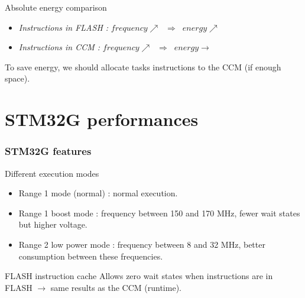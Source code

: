 \documentclass[
	11pt, %
]{beamer}
\begin{document}
\begin{frame}{Absolute energy comparison}
\begin{figure}
	\end{figure}
	\begin{itemize}
		\item \emph{Instructions in FLASH :} $frequency \nearrow \; \; \Rightarrow \; \; energy \nearrow$
		\item \emph{Instructions in CCM : } $frequency \nearrow \; \; \Rightarrow \; \; energy \rightarrow$ 
	\end{itemize}
	To save energy, we should allocate tasks instructions to the CCM (if enough space).
\end{frame}


\section{STM32G performances}
\begin{frame}
	\frametitle{STM32G features}
	\begin{block}{Different execution modes}
		\begin{itemize}
			\item Range 1 mode (normal) : normal execution.
			\item Range 1 boost mode : frequency between 150 and 170 MHz, fewer wait states but higher voltage.
			\item Range 2 low power mode : frequency between 8 and 32 MHz, better consumption between these frequencies.
		\end{itemize}
	\end{block}
	\begin{block}{FLASH instruction cache}
		Allows zero wait states when instructions are in FLASH $\rightarrow$ same results as the CCM (runtime).
	\end{block}
\end{frame}
\end{document}
